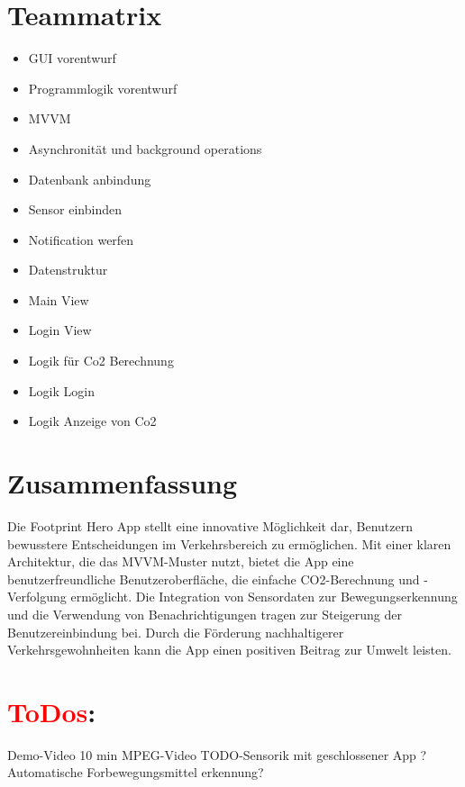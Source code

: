 \documentclass{article}
\begin{document}
  
\section{Teammatrix}
 \begin{itemize}
 \item GUI vorentwurf
 \item Programmlogik vorentwurf
 \item MVVM
 \item Asynchronität und background operations
 \item Datenbank anbindung
 \item Sensor einbinden
 \item Notification werfen
 \item Datenstruktur
 \item Main View
 \item Login View
 \item Logik für Co2 Berechnung
 \item Logik Login
 \item Logik Anzeige von Co2
 \end{itemize}
    


\section{Zusammenfassung}

Die Footprint Hero App stellt eine innovative Möglichkeit dar, Benutzern bewusstere Entscheidungen im Verkehrsbereich zu ermöglichen. Mit einer klaren Architektur, die das MVVM-Muster nutzt, bietet die App eine benutzerfreundliche Benutzeroberfläche, die einfache CO2-Berechnung und -Verfolgung ermöglicht. Die Integration von Sensordaten zur Bewegungserkennung und die Verwendung von Benachrichtigungen tragen zur Steigerung der Benutzereinbindung bei. Durch die Förderung nachhaltigerer Verkehrsgewohnheiten kann die App einen positiven Beitrag zur Umwelt leisten.


\section{\textcolor{red}{ToDos}:}
Demo-Video 10 min MPEG-Video
TODO-Sensorik mit geschlossener App ?
Automatische Forbewegungsmittel erkennung?
\end{document}
